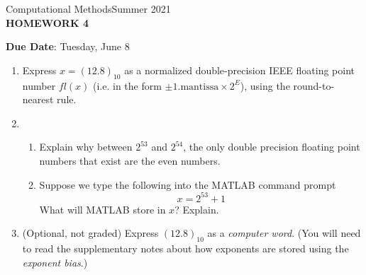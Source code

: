 \documentclass[12pt]{article}
\begin{document}
\begin{center}
Computational Methods\qquad Summer 2021
\\

\textbf{\large HOMEWORK 4}\\
\end{center}
\noindent \textbf{Due Date}: Tuesday, June 8\\

\begin{enumerate}
\item Express $x = (12.8)_{10}$ as a normalized double-precision IEEE floating point number $fl(x)$ (i.e. in the form $\pm 1.\textrm{mantissa}\times 2^E$), using the round-to-nearest rule.
\item \begin{enumerate}
\item Explain why between $2^{53}$ and $2^{54}$, the only double precision floating point numbers that exist are the even numbers. 
\item Suppose we type the following into the MATLAB command prompt
	\[x = 2^{53}+1\]
	What will MATLAB store in $x$? Explain. 
\end{enumerate}
\item (Optional, not graded) Express $(12.8)_{10}$ as a \emph{computer word}. (You will need to read the supplementary notes about how exponents are stored using the \emph{exponent bias}.)
\end{enumerate}
\end{document}
